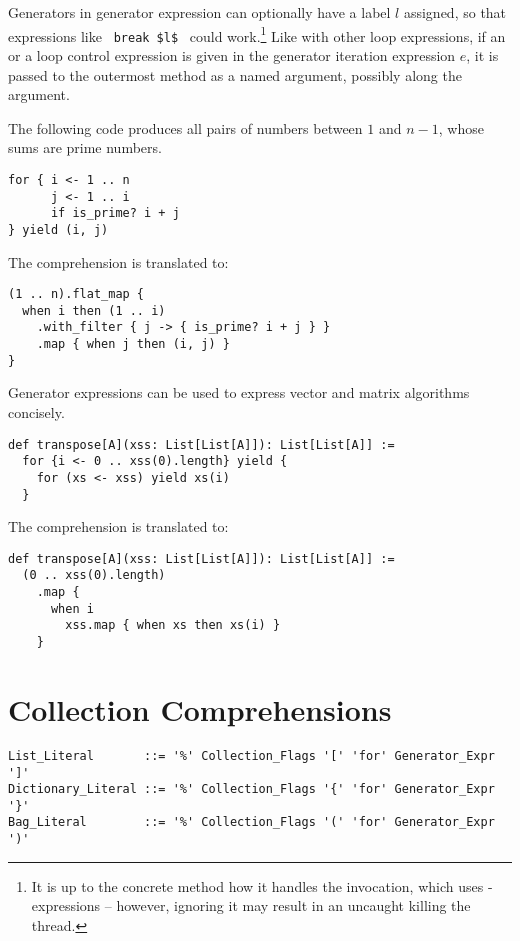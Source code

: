 Generators in generator expression can optionally have a label $l$ assigned, so that expressions like ~\lstinline!break $l$!~ could work.\footnote{It is up to the concrete method how it handles the invocation, which uses - expressions -- however, ignoring it may result in an uncaught  killing the thread.} Like with other loop expressions, if an  or a  loop control expression is given in the generator iteration expression $e$, it is passed to the outermost  method as a named argument, possibly along the  argument. 

\example The following code produces all pairs of numbers between $1$ and $n - 1$, whose sums are prime numbers. 
\begin{lstlisting}
for { i <- 1 .. n
      j <- 1 .. i
      if is_prime? i + j
} yield (i, j)
\end{lstlisting}
The comprehension is translated to:
\begin{lstlisting}
(1 .. n).flat_map {
  when i then (1 .. i)
    .with_filter { j -> { is_prime? i + j } }
    .map { when j then (i, j) }
}
\end{lstlisting}

\example Generator expressions can be used to express vector and matrix algorithms concisely.
\begin{lstlisting}
def transpose[A](xss: List[List[A]]): List[List[A]] :=
  for {i <- 0 .. xss(0).length} yield {
    for (xs <- xss) yield xs(i)
  }
\end{lstlisting} 
The comprehension is translated to: 
\begin{lstlisting}
def transpose[A](xss: List[List[A]]): List[List[A]] := 
  (0 .. xss(0).length)
    .map { 
      when i 
        xss.map { when xs then xs(i) }
    }
\end{lstlisting}






\section{Collection Comprehensions}
\label{sec:collection-comprehensions}

\syntax\begin{lstlisting}
List_Literal       ::= '%' Collection_Flags '[' 'for' Generator_Expr ']'
Dictionary_Literal ::= '%' Collection_Flags '{' 'for' Generator_Expr '}'
Bag_Literal        ::= '%' Collection_Flags '(' 'for' Generator_Expr ')'
\end{lstlisting}

